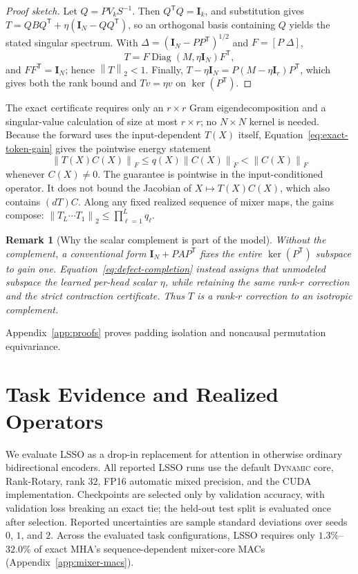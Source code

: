 \documentclass[10pt]{article}
\newtheorem{remark}[theorem]{Remark}
\newcommand{\I}{\mathbf{I}}
\newcommand{\T}{\mathsf{T}}
\newcommand{\norm}[1]{\left\lVert #1 \right\rVert}
\newcommand{\diag}{\operatorname{Diag}}
\begin{document}
\begin{proof}[Proof sketch]
Let $Q=PV_kS^{-1}$.  Then $Q^\T Q=\I_k$, and substitution gives
$T=QBQ^\T+\eta(\I_N-QQ^\T)$, so an orthogonal basis containing $Q$ yields the
stated singular spectrum.  With $\Delta=(\I_N-PP^\T)^{1/2}$ and
$F=[P\;\Delta]$,
\begin{equation}
    T=F\diag(M,\eta\I_N)F^\T,
\label{eq:defect-completion}
\end{equation}
and $FF^\T=\I_N$; hence $\norm{T}_2<1$.  Finally,
$T-\eta\I_N=P(M-\eta\I_r)P^\T$, which gives both the rank bound and
$Tv=\eta v$ on $\ker(P^\T)$.
\end{proof}

The exact certificate requires only an
$r\times r$ Gram eigendecomposition and a singular-value calculation of size
at most $r\times r$; no $N\times N$ kernel is needed.  Because the forward uses the
input-dependent $T(X)$ itself, Equation~\eqref{eq:exact-token-gain} gives the
pointwise energy statement
\begin{equation}
    \norm{T(X)C(X)}_F\leq q(X)\norm{C(X)}_F<\norm{C(X)}_F
\label{eq:pointwise-energy}
\end{equation}
whenever $C(X)\neq0$.  The guarantee is pointwise in the input-conditioned
operator.  It does not bound the Jacobian of $X\mapsto T(X)C(X)$,
which also contains $(dT)C$.  Along any fixed realized sequence of mixer maps, the gains compose:
$\norm{T_L\cdots T_1}_2\leq\prod_{\ell=1}^L q_\ell$.

\begin{remark}[Why the scalar complement is part of the model]
\label{rem:complement}
Without the complement, a conventional form $\I_N+PAP^\T$ fixes the entire
$\ker(P^\T)$ subspace to gain one.  Equation~\eqref{eq:defect-completion}
instead assigns that unmodeled subspace the learned per-head scalar $\eta$,
while retaining the same rank-$r$ correction and the strict contraction
certificate.  Thus $T$ is a rank-$r$ correction to an isotropic complement.
\end{remark}

Appendix~\ref{app:proofs} proves padding isolation and noncausal permutation
equivariance.

\section{Task Evidence and Realized Operators}
\label{sec:sequence-experiments}

We evaluate LSSO as a drop-in replacement for attention in otherwise ordinary
bidirectional encoders.  All reported LSSO runs use the default
\textsc{Dynamic} core, Rank-Rotary, rank $32$, FP16
automatic mixed precision, and the CUDA implementation.  Checkpoints are
selected only by validation accuracy, with validation loss breaking an exact
tie; the held-out test split is evaluated once after selection.  Reported
uncertainties are sample standard deviations over seeds $0$, $1$, and $2$.
Across the evaluated task configurations, LSSO requires only
$1.3\%$--$32.0\%$ of exact MHA's sequence-dependent mixer-core MACs
(Appendix~\ref{app:mixer-macs}).
\end{document}
